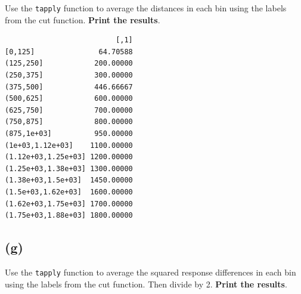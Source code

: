 \documentclass[
  letterpaper,
  DIV=11,
  numbers=noendperiod]{scrartcl}
\newenvironment{Shaded}{\begin{snugshade}}{\end{snugshade}}
\newcommand{\AttributeTok}[1]{\textcolor[rgb]{0.40,0.45,0.13}{#1}}
\newcommand{\FunctionTok}[1]{\textcolor[rgb]{0.28,0.35,0.67}{#1}}
\newcommand{\NormalTok}[1]{\textcolor[rgb]{0.00,0.23,0.31}{#1}}
\newcommand{\OtherTok}[1]{\textcolor[rgb]{0.00,0.23,0.31}{#1}}
\newcommand{\SpecialCharTok}[1]{\textcolor[rgb]{0.37,0.37,0.37}{#1}}
\begin{document}
Use the \texttt{tapply} function to average the distances in each bin
using the labels from the cut function. \textbf{Print the results}.

\begin{Shaded}
\end{Shaded}

\begin{verbatim}
                          [,1]
[0,125]               64.70588
(125,250]            200.00000
(250,375]            300.00000
(375,500]            446.66667
(500,625]            600.00000
(625,750]            700.00000
(750,875]            800.00000
(875,1e+03]          950.00000
(1e+03,1.12e+03]    1100.00000
(1.12e+03,1.25e+03] 1200.00000
(1.25e+03,1.38e+03] 1300.00000
(1.38e+03,1.5e+03]  1450.00000
(1.5e+03,1.62e+03]  1600.00000
(1.62e+03,1.75e+03] 1700.00000
(1.75e+03,1.88e+03] 1800.00000
\end{verbatim}

\hypertarget{g}{%
\subsection{(g)}\label{g}}

Use the \texttt{tapply} function to average the squared response
differences in each bin using the labels from the cut function. Then
divide by 2. \textbf{Print the results}.
\end{document}
